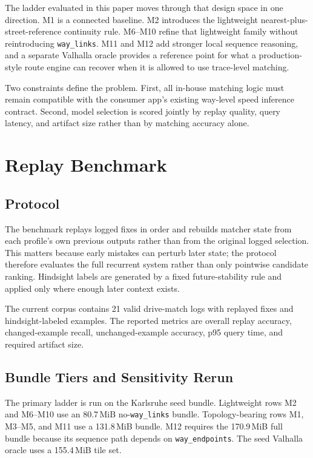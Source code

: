 \documentclass{IOS-Book-Article}
\begin{document}
The ladder evaluated in this paper moves through that design space in one direction. M1 is a connected baseline. M2 introduces the lightweight nearest-plus-street-reference continuity rule. M6--M10 refine that lightweight family without reintroducing \texttt{way\_links}. M11 and M12 add stronger local sequence reasoning, and a separate Valhalla oracle provides a reference point for what a production-style route engine can recover when it is allowed to use trace-level matching.

Two constraints define the problem. First, all in-house matching logic must remain compatible with the consumer app's existing way-level speed inference contract. Second, model selection is scored jointly by replay quality, query latency, and artifact size rather than by matching accuracy alone.

\section{Replay Benchmark}
\subsection{Protocol}
The benchmark replays logged fixes in order and rebuilds matcher state from each profile's own previous outputs rather than from the original logged selection. This matters because early mistakes can perturb later state; the protocol therefore evaluates the full recurrent system rather than only pointwise candidate ranking. Hindsight labels are generated by a fixed future-stability rule and applied only where enough later context exists.

The current corpus contains 21 valid drive-match logs with \MatcherLadderCorpusFixes{} replayed fixes and \MatcherLadderPseudoExamples{} hindsight-labeled examples. The reported metrics are overall replay accuracy, changed-example recall, unchanged-example accuracy, p95 query time, and required artifact size.

\subsection{Bundle Tiers and Sensitivity Rerun}
The primary ladder is run on the Karlsruhe seed bundle. Lightweight rows M2 and M6--M10 use an 80.7\,MiB no-\texttt{way\_links} bundle. Topology-bearing rows M1, M3--M5, and M11 use a 131.8\,MiB bundle. M12 requires the 170.9\,MiB full bundle because its sequence path depends on \texttt{way\_endpoints}. The seed Valhalla oracle uses a 155.4\,MiB tile set.
\end{document}
